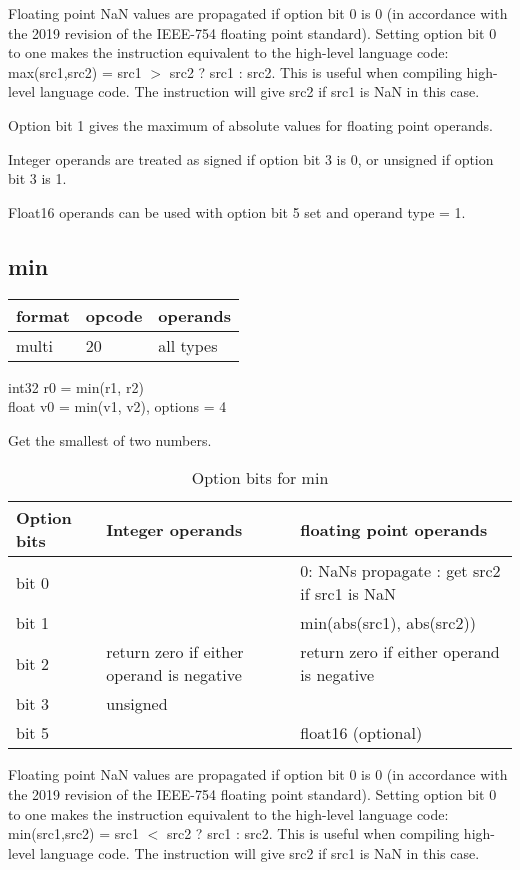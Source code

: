 \documentclass[forwardcom.tex]{subfiles}
\begin{document}
Floating point NaN values are propagated if option bit 0 is 0 (in accordance with the 2019 revision of the IEEE-754 floating point standard). 
Setting option bit 0 to one makes the instruction equivalent to the high-level language code:  max(src1,src2) = src1 $>$ src2 ? src1 : src2. This is useful when compiling high-level language code. The instruction will give src2 if src1 is NaN in this case. 
\vv

Option bit 1 gives the maximum of absolute values for floating point operands.
\vv

Integer operands are treated as signed if option bit 3 is 0, or unsigned if option bit 3 is 1.
\vv

Float16 operands can be used with option bit 5 set and operand type = 1.
\vv


\subsection{min}
\label{table:minInstruction}
\begin{tabular}{|p{12mm}|p{15mm}|p{100mm}|}
\hline
\bfseries format & \bfseries opcode & \bfseries operands \\ \hline
multi & 20 & all types \\ \hline
\end{tabular}
\vv

int32 r0 = min(r1, r2) \\
float v0 = min(v1, v2), options = 4
\vv

Get the smallest of two numbers.
\vv

\begin{longtable} {|p{16mm}|p{50mm}|p{50mm}|}
\caption{Option bits for min} 
\endfirsthead
\endhead
\hline
\bfseries Option bits & \bfseries Integer operands & \bfseries floating point operands   \\
\hline
bit 0 &  & 0: NaNs propagate \newline 1: get src2 if src1 is NaN \\
\hline
bit 1 &  & min(abs(src1), abs(src2)) \\
\hline
bit 2 & return zero if either operand is negative & return zero if either operand is negative \\
\hline
bit 3 & unsigned & \\
\hline
bit 5 &  & float16 (optional) \\
\hline
\end{longtable}


Floating point NaN values are propagated if option bit 0 is 0 (in accordance with the 2019 revision of the IEEE-754 floating point standard). 
Setting option bit 0 to one makes the instruction equivalent to the high-level language code:  min(src1,src2) = src1 $<${} src2 ? src1 : src2. This is useful when compiling high-level language code. The instruction will give src2 if src1 is NaN in this case.
\vv
\end{document}
